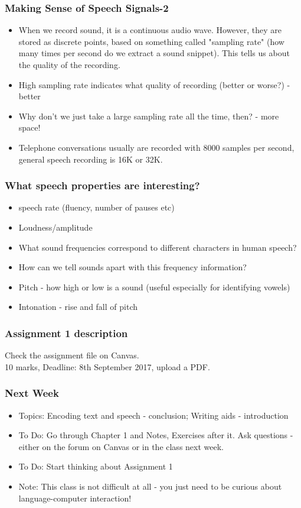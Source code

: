 \documentclass{beamer}
\begin{document}
\begin{frame}
\frametitle{Making Sense of Speech Signals-2}
\begin{itemize}
\item When we record sound, it is a continuous audio wave. However, they are stored as discrete points, based on something called "sampling rate" (how many times per second do we extract a sound snippet). This tells us about the quality of the recording. 
\item High sampling rate indicates what quality of recording (better or worse?) \pause - better
\item Why don't we just take a large sampling rate all the time, then? \pause - more space!
\item Telephone conversations usually are recorded with 8000 samples per second, general speech recording is 16K or 32K.
\end{itemize}
\end{frame}

\begin{frame}
\frametitle{What speech properties are interesting?}
\begin{itemize}
\item speech rate (fluency, number of pauses etc)
\item Loudness/amplitude 
\item What sound frequencies correspond to different characters in human speech? 
\item How can we tell sounds apart with this frequency information?
\item Pitch - how high or low is a sound (useful especially for identifying vowels)
\item Intonation - rise and fall of pitch
\end{itemize}
\end{frame}

\begin{frame}
\frametitle{Assignment 1 description}
Check the assignment file on Canvas.
\\ 10 marks, Deadline: 8th September 2017, upload a PDF. 
\end{frame}

\begin{frame}
\frametitle{Next Week}
\begin{itemize}
\item Topics: Encoding text and speech - conclusion; Writing aids - introduction
\item To Do: Go through Chapter 1 and Notes, Exercises after it. Ask questions - either on the forum on Canvas or in the class next week.
\item To Do: Start thinking about Assignment 1
\item Note: This class is not difficult at all - you just need to be curious about language-computer interaction!
\end{itemize}
\end{frame}
\end{document}
